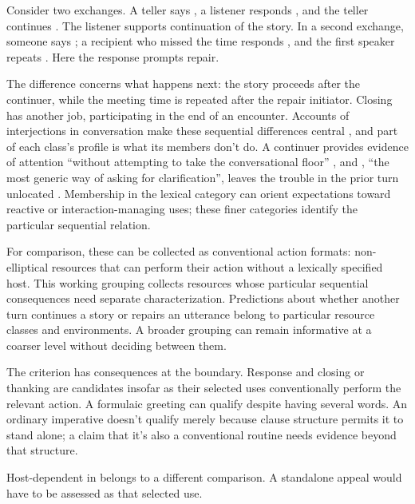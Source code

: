 \documentclass[12pt]{article}
\begin{document}
Consider two exchanges. A teller says , a listener responds , and the teller continues
. The listener supports continuation of the
story. In a second exchange, someone says ;
a recipient who missed the time responds , and the first
speaker repeats . Here the response prompts repair.

The difference concerns what happens next: the story proceeds after
the continuer, while the meeting time is repeated after the repair
initiator. Closing  has another job, participating in the
end of an encounter. Accounts of interjections in conversation make
these sequential differences central \citep[257--259, 263--265]{dingemanse2024},
and part of each class's profile is what its members don't do. A continuer
provides evidence of attention \enquote{without attempting to take the
conversational floor} \citep[266]{dingemanse2024}, and ,
\enquote{the most generic way of asking for clarification}, leaves the
trouble in the prior turn unlocated \citep[267]{dingemanse2024}.
Membership in the lexical category can orient expectations toward reactive
or interaction-managing uses; these finer categories identify the particular
sequential relation.

For comparison, these can be collected as conventional action formats:
non-elliptical resources that can perform their action without a lexically
specified host. This working grouping collects resources whose particular sequential
consequences need separate characterization. Predictions about whether
another turn continues a story or repairs an utterance belong to
particular resource classes and environments. A broader grouping can
remain informative at a coarser level without deciding between them.

The criterion has consequences at the boundary. Response 
and closing or thanking  are candidates insofar as their
selected uses conventionally perform the relevant action. A formulaic
greeting  can qualify despite having several words.
An ordinary imperative  doesn't qualify merely because
clause structure permits it to stand alone; a claim that it's also a
conventional routine needs evidence beyond that structure.

Host-dependent  in  belongs to
a different comparison. A standalone appeal  would have
to be assessed as that selected use.
\end{document}
